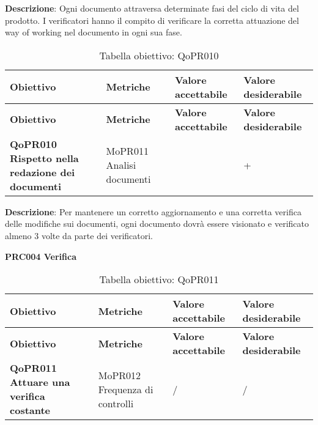\documentclass[../piano-di-qualifica.tex]{subfiles}
\begin{document}
\textbf{Descrizione}: Ogni documento attraversa determinate fasi del ciclo di vita del prodotto. I verificatori hanno il compito di verificare la corretta attuazione del way of working nel documento in ogni sua fase.

\renewcommand{\arraystretch}{2} %
\begin{longtable}[H]{>{\centering\bfseries}m{5cm} >{\centering}m{5cm} >{\centering}m{2.5cm} >{\centering\arraybackslash}m{2.5cm}}  
    \caption{Tabella obiettivo: QoPR010}%
    \label{tab:requisiti_funzionali} \\
  \rowcolor{lightgray}
  {\textbf{Obiettivo}} & {\textbf{Metriche}} & {\textbf{Valore accettabile}} & {\textbf{Valore desiderabile}}  \\
  \endfirsthead%
  \rowcolor{lightgray}
  {\textbf{Obiettivo}} & {\textbf{Metriche}} & {\textbf{Valore accettabile}} & {\textbf{Valore desiderabile}}  \\
  \endhead%
  \textbf{QoPR010 Rispetto nella redazione dei documenti} & MoPR011 Analisi documenti & 3 & 4+ \\
\end{longtable}

\textbf{Descrizione}: Per mantenere un corretto aggiornamento e una corretta verifica delle modifiche sui documenti, ogni documento dovrà essere visionato e verificato almeno 3 volte da parte dei verificatori.

        \begin{center}
            \centering
            \textbf{PRC004 Verifica}
        \end{center}

        \renewcommand{\arraystretch}{2} %
        \begin{longtable}[H]{>{\centering\bfseries}m{5cm} >{\centering}m{5cm} >{\centering}m{2.5cm} >{\centering\arraybackslash}m{2.5cm}}  
            \caption{Tabella obiettivo: QoPR011}%
            \label{tab:requisiti_funzionali} \\
          \rowcolor{lightgray}
          {\textbf{Obiettivo}} & {\textbf{Metriche}} & {\textbf{Valore accettabile}} & {\textbf{Valore desiderabile}}  \\
          \endfirsthead%
          \rowcolor{lightgray}
          {\textbf{Obiettivo}} & {\textbf{Metriche}} & {\textbf{Valore accettabile}} & {\textbf{Valore desiderabile}}  \\
          \endhead%
          \textbf{QoPR011 Attuare una verifica costante} & MoPR012 Frequenza di controlli & / & / \\
        \end{longtable}
        
\end{document}

